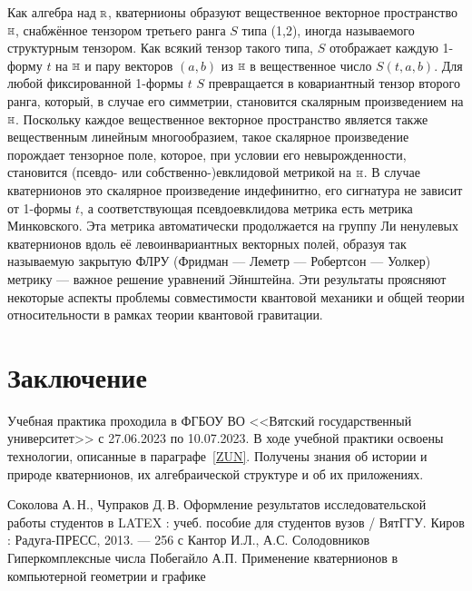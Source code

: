 \documentclass[14pt,Report]{diplomwork}
\begin{document}
Как алгебра над 
$\displaystyle \scriptstyle \mathbb {R} $, кватернионы образуют вещественное векторное пространство 
$\displaystyle \scriptstyle \mathbb {H} $, снабжённое тензором третьего ранга 
$\displaystyle S$ типа (1,2), иногда называемого структурным тензором. Как всякий тензор такого типа, 
$\displaystyle S$ отображает каждую 1-форму 
$\displaystyle t$ на 
$\displaystyle \scriptstyle \mathbb {H} $ и пару векторов 
$\displaystyle \left(a,b\right)$ из 
$\displaystyle \scriptstyle \mathbb {H} $ в вещественное число 
$\displaystyle S\left(t,a,b\right)$. Для любой фиксированной 1-формы 
$\displaystyle t$
$\displaystyle S$ превращается в ковариантный тензор второго ранга, который, в случае его симметрии, становится скалярным произведением на 
$\displaystyle \scriptstyle \mathbb {H} $. Поскольку каждое вещественное векторное пространство является также вещественным линейным многообразием, такое скалярное произведение порождает тензорное поле, которое, при условии его невырожденности, становится (псевдо- или собственно-)евклидовой метрикой на 
$\displaystyle \scriptstyle \mathbb {H} $. В случае кватернионов это скалярное произведение индефинитно, его сигнатура не зависит от 1-формы 
$\displaystyle t$, а соответствующая псевдоевклидова метрика есть метрика Минковского. Эта метрика автоматически продолжается на группу Ли ненулевых кватернионов вдоль её левоинвариантных векторных полей, образуя так называемую закрытую ФЛРУ (Фридман — Леметр — Робертсон — Уолкер) метрику — важное решение уравнений Эйнштейна. Эти результаты проясняют некоторые аспекты проблемы совместимости квантовой механики и общей теории относительности в рамках теории квантовой гравитации.






			\chapter{Заключение}
			Учебная практика проходила в ФГБОУ ВО <<Вятский государственный университет>>
			с 27.06.2023 по 10.07.2023.
			В ходе учебной практики освоены технологии, описанные в параграфе~\ref{ZUN}.
			Получены знания об истории и природе кватернионов, их алгебраической структуре и об их приложениях.
			\begin{thebibliography}{99}
				Соколова А.\,Н., Чупраков Д.\,В. Оформление результатов исследовательской работы студентов в LATEX : учеб. пособие для студентов вузов / ВятГГУ. Киров : Радуга-ПРЕСС, 2013. --- 256 с
				Кантор И.Л., А.С. Солодовников Гиперкомплексные числа
				Побегайло А.П. Применение кватернионов в компьютерной геометрии и графике
			\end{thebibliography}
\end{document}

